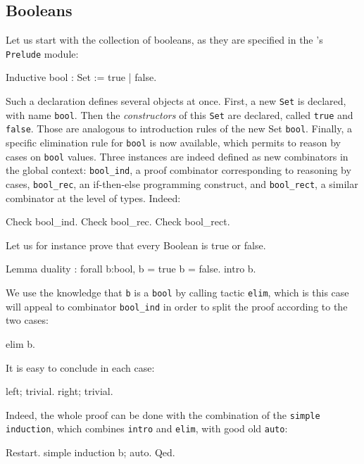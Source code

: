 \documentclass[11pt,a4paper]{book}
\begin{document}
\subsection{Booleans}

Let us start with the collection of booleans, as they are specified
in the \Coq's \verb:Prelude: module: 
\begin{coq_example}
Inductive bool :  Set := true | false.
\end{coq_example}

Such a declaration defines several objects at once. First, a new
\verb:Set: is declared, with name \verb:bool:. Then the {\sl constructors}
of this \verb:Set: are declared, called \verb:true: and \verb:false:.
Those are analogous to introduction rules of the new Set \verb:bool:.
Finally, a specific elimination rule for \verb:bool: is now available, which
permits to reason by cases on \verb:bool: values. Three instances are
indeed defined as new combinators in the global context: \verb:bool_ind:,
a proof combinator corresponding to reasoning by cases,
\verb:bool_rec:, an if-then-else programming construct,
and \verb:bool_rect:, a similar combinator at the level of types.
Indeed:
\begin{coq_example}
Check bool_ind.
Check bool_rec.
Check bool_rect.
\end{coq_example}

Let us for instance prove that every Boolean is true or false.
\begin{coq_example}
Lemma duality : forall b:bool, b = true \/ b = false.
intro b.
\end{coq_example}

We use the knowledge that \verb:b: is a \verb:bool: by calling tactic
\verb:elim:, which is this case will appeal to combinator \verb:bool_ind:
in order to split the proof according to the two cases:
\begin{coq_example}
elim b.
\end{coq_example}

It is easy to conclude in each case:
\begin{coq_example}
left; trivial.
right; trivial.
\end{coq_example}

Indeed, the whole proof can be done with the combination of the
 \verb:simple: \verb:induction:, which combines \verb:intro: and \verb:elim:,
with good old \verb:auto::
\begin{coq_example}
Restart.
simple induction b; auto.
Qed.
\end{coq_example}
\end{document}
